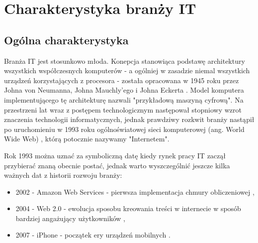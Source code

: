 

\chapter{Charakterystyka branży IT}\label{ch:it-sector}


\section{Ogólna charakterystyka}\label{sec:it-industry-summary}

Branża IT jest stosunkowo młoda.
Konepcja stanowiąca podstawę architektury wszystkich współczesnych komputerów - a ogólniej w zasadzie niemal wszystkich urządzeń korzystających z procesora - została opracowana w 1945 roku przez Johna von Neumanna, Johna Mauchly’ego i Johna Eckerta \cite{von-neumann-2020}.
Model komputera implementującego tę architekturę nazwali "przykładową maszyną cyfrową".
Na przestrzeni lat wraz z postępem technologicznym następował stopniowy wzrot znaczenia technologii informatycznych,
jednak prawdziwy rozkwit branży nastąpił po uruchomieniu w 1993 roku ogólnoświatowej sieci komputerowej (ang. World Wide Web) \cite{rangarajan-2014}, którą potocznie nazywamy "Internetem".

Rok 1993 można uznać za symboliczną datę kiedy rynek pracy IT zaczął przybierać znaną obecnie postać, jednak warto wyszczególnić jeszcze kilka ważnych dat z historii rozwoju branży:
\begin{itemize}
    \item 2002 - Amazon Web Services - pierwsza implementacja chmury obliczeniowej \cite{aws-2017},
    \item 2004 - Web 2.0 - ewolucja sposobu kreowania treści w internecie w sposób bardziej angażujący użytkowników \cite{web-2.0-2007},
    \item 2007 - iPhone - początek ery urządzeń mobilnych \cite{iphone-2018}.
\end{itemize}

